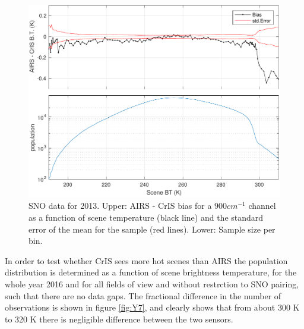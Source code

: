 \documentclass[twocolumn,10pt]{article}
\begin{document}
\begin{figure}[htb]
\centering
\includegraphics[width=\linewidth]{./figs/AC_jplSNO_900wn_bias_vs_scene.pdf}
\caption{\label{fig:orgparagraph18}
  SNO data for 2013. Upper: AIRS - CrIS bias for a $900 cm^{-1}$ channel as a function of scene temperature (black line) and the standard error of the mean for the sample (red lines). Lower: Sample size per bin.}
\label{fig:Y6}
\end{figure}

In order to test whether CrIS sees more hot scenes than AIRS the population distribution is determined as a function of scene brightness temperature, for the whole year 2016 and for all fields of view and without restrction to SNO pairing, such that there are no data gaps. The fractional difference in the number of observations is shown in figure \ref{fig:Y7}, and clearly shows that from about 300 K to 320 K there is negligible difference between the two sensors.  
\end{document}

